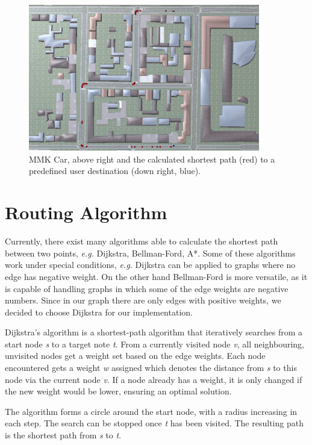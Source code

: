 \begin{figure}[htb]
	\centering
	\includegraphics[width=0.9\textwidth]{figures/nav}
	\caption{MMK Car, above right and the calculated shortest path (red) to a predefined user destination (down right, blue).}
	\label{fig:nav}
\end{figure}
\section{Routing Algorithm}
Currently, there exist many algorithms able to calculate the shortest path between two points, \emph{e.g.} Dijkstra, Bellman-Ford, A*. Some of these algorithms work under special conditions, \emph{e.g.} Dijkstra can be applied to graphs where no edge has negative weight. On the other hand Bellman-Ford is more versatile, as it is capable of handling graphs in which some of the edge weights are negative numbers. Since in our graph there are only edges with positive weights, we decided to choose Dijkstra for our implementation.

Dijkstra's algorithm is a shortest-path algorithm that iteratively searches from a start node \emph{s} to a target note \emph{t}\cite{skiena1998algorithm}. From a currently visited node \emph{v}, all neighbouring, unvisited nodes get a weight set based on the edge weights. Each node encountered gets a weight \emph{w} assigned which denotes the distance from \emph{s} to this node via the current node \emph{v}. If a node already has a weight, it is only changed if the new weight would be lower, ensuring an optimal solution.

The algorithm forms a circle around the start node, with a radius increasing in each step. The search can be stopped once \emph{t} has been visited. The resulting path is the shortest path from \emph{s} to \emph{t}.

